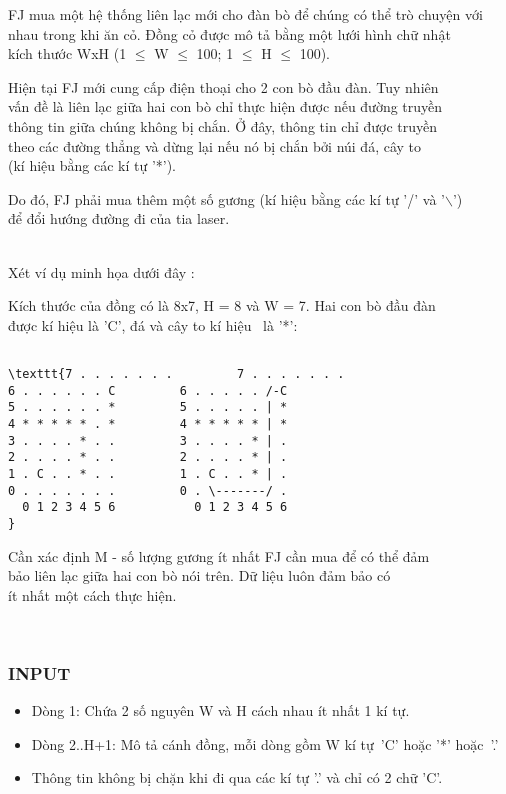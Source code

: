 

FJ mua một hệ thống liên lạc mới cho đàn bò để chúng có thể trò chuyện với
\\nhau trong khi ăn cỏ. Đồng cỏ được mô tả bằng một lưới hình chữ nhật
\\kích thước WxH (1  $\le$  W  $\le$  100; 1  $\le$  H  $\le$  100). 

Hiện tại FJ mới cung cấp điện thoại cho 2 con bò đầu đàn. Tuy nhiên
\\vấn đề là liên lạc giữa hai con bò chỉ thực hiện được nếu đường truyền
\\thông tin giữa chúng không bị chắn. Ở đây, thông tin chỉ được truyền
\\theo các đường thẳng và dừng lại nếu nó bị chắn bởi núi đá, cây to
\\(kí hiệu bằng các kí tự '*'). 

Do đó, FJ phải mua thêm một số gương (kí hiệu bằng các kí tự '/' và '$\backslash$')
\\để đổi hướng đường đi của tia laser.


\\Xét ví dụ minh họa dưới đây : 

Kích thước của đồng có là 8x7, H = 8 và W = 7. Hai con bò đầu đàn
\\được kí hiệu là 'C', đá và cây to kí hiệu  là '*':
\begin{verbatim}

\texttt{7 . . . . . . .         7 . . . . . . .
6 . . . . . . C         6 . . . . . /-C
5 . . . . . . *         5 . . . . . | *
4 * * * * * . *         4 * * * * * | *
3 . . . . * . .         3 . . . . * | .
2 . . . . * . .         2 . . . . * | .
1 . C . . * . .         1 . C . . * | .
0 . . . . . . .         0 . \-------/ .
  0 1 2 3 4 5 6           0 1 2 3 4 5 6
}\end{verbatim}

Cần xác định M - số lượng gương ít nhất FJ cần mua để có thể đảm
\\bảo liên lạc giữa hai con bò nói trên. Dữ liệu luôn đảm bảo có
\\ít nhất một cách thực hiện.

 

\subsubsection{INPUT}
\begin{itemize}
	\item 

Dòng 1: Chứa 2 số nguyên W và H cách nhau ít nhất 1 kí tự.
	\item 

Dòng 2..H+1: Mô tả cánh đồng, mỗi dòng gồm W kí tự 'C' hoặc '*' hoặc '.'
	\item 

Thông tin không bị chặn khi đi qua các kí tự '.' và chỉ có 2 chữ 'C'.
\end{itemize}

